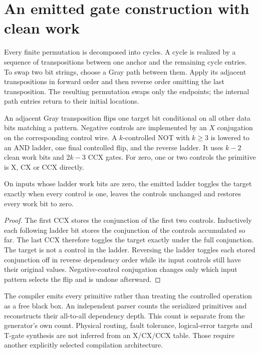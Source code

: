 \section{An emitted gate construction with clean work}

Every finite permutation is decomposed into cycles. A cycle is realized by a sequence of transpositions between one anchor and the remaining cycle entries. To swap two bit strings, choose a Gray path between them. Apply its adjacent transpositions in forward order and then reverse order omitting the last transposition. The resulting permutation swaps only the endpoints; the internal path entries return to their initial locations.

An adjacent Gray transposition flips one target bit conditional on all other data bits matching a pattern. Negative controls are implemented by an $X$ conjugation on the corresponding control wire. A $k$-controlled NOT with $k\ge3$ is lowered to an AND ladder, one final controlled flip, and the reverse ladder. It uses $k-2$ clean work bits and $2k-3$ CCX gates. For zero, one or two controls the primitive is X, CX or CCX directly.

\begin{proposition}
On inputs whose ladder work bits are zero, the emitted ladder toggles the target exactly when every control is one, leaves the controls unchanged and restores every work bit to zero.
\end{proposition}
\begin{proof}
The first CCX stores the conjunction of the first two controls. Inductively each following ladder bit stores the conjunction of the controls accumulated so far. The last CCX therefore toggles the target exactly under the full conjunction. The target is not a control in the ladder. Reversing the ladder toggles each stored conjunction off in reverse dependency order while its input controls still have their original values. Negative-control conjugation changes only which input pattern selects the flip and is undone afterward.
\end{proof}

The compiler emits every primitive rather than treating the controlled operation as a free black box. An independent parser counts the serialized primitives and reconstructs their all-to-all dependency depth. This count is separate from the generator's own count. Physical routing, fault tolerance, logical-error targets and T-gate synthesis are not inferred from an X/CX/CCX table. Those require another explicitly selected compilation architecture.

